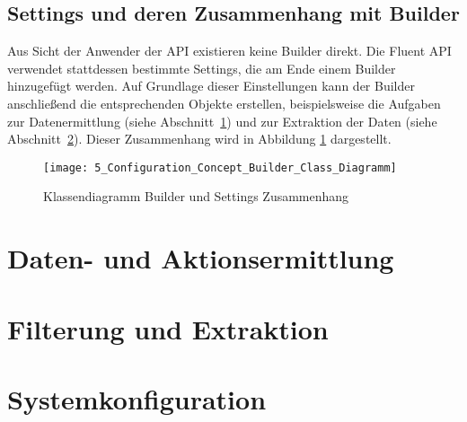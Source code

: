\subsection{Settings und deren Zusammenhang mit Builder}
Aus Sicht der Anwender der API existieren keine Builder direkt. Die Fluent API verwendet stattdessen bestimmte Settings, die am Ende einem Builder hinzugefügt werden. Auf Grundlage dieser Einstellungen kann der Builder anschließend die entsprechenden Objekte erstellen, beispielsweise die Aufgaben zur Datenermittlung (siehe Abschnitt~\ref{sec:data_collection_concept}) und zur Extraktion der Daten (siehe Abschnitt~\ref{sec:data_extraction_concept}).  
Dieser Zusammenhang wird in Abbildung \ref{fig:builder_and_settings_cooperation} dargestellt.

\begin{figure}[H]
    \centering
    \texttt{[image: 5\_Configuration\_Concept\_Builder\_Class\_Diagramm]}
    \caption{Klassendiagramm Builder und Settings Zusammenhang}
    \label{fig:builder_and_settings_cooperation}
\end{figure}

\section{Daten- und Aktionsermittlung}
\label{sec:data_collection_concept}

\section{Filterung und Extraktion}
\label{sec:data_extraction_concept}

\section{Systemkonfiguration}
\label{sec:integration_concept}


